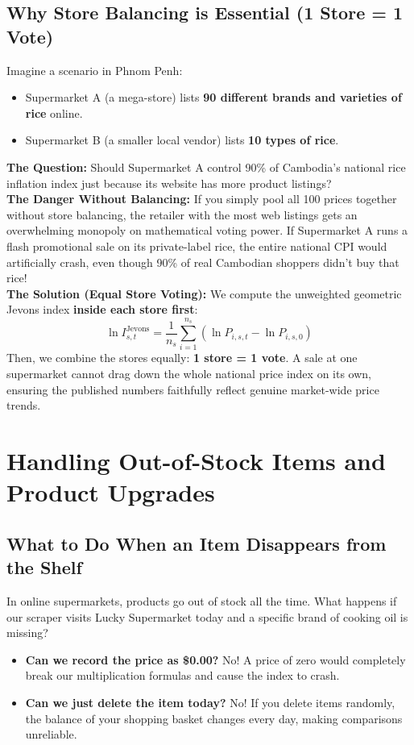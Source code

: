 \documentclass[11pt,a4paper,oneside]{article}
\begin{document}
\subsection{Why Store Balancing is Essential (1 Store = 1 Vote)}
Imagine a scenario in Phnom Penh:
\begin{itemize}
    \item Supermarket A (a mega-store) lists \textbf{90 different brands and varieties of rice} online.
    \item Supermarket B (a smaller local vendor) lists \textbf{10 types of rice}.
\end{itemize}
\textbf{The Question:} Should Supermarket A control 90\% of Cambodia's national rice inflation index just because its website has more product listings?\\
\textbf{The Danger Without Balancing:} If you simply pool all 100 prices together without store balancing, the retailer with the most web listings gets an overwhelming monopoly on mathematical voting power. If Supermarket A runs a flash promotional sale on its private-label rice, the entire national CPI would artificially crash, even though 90\% of real Cambodian shoppers didn't buy that rice!\\
\textbf{The Solution (Equal Store Voting):} We compute the unweighted geometric Jevons index \textbf{inside each store first}:
\begin{equation}
\ln I_{s, t}^{\text{Jevons}} = \frac{1}{n_s} \sum_{i=1}^{n_s} \left( \ln P_{i, s, t} - \ln P_{i, s, 0} \right)
\end{equation}
Then, we combine the stores equally: \textbf{1 store = 1 vote}. A sale at one supermarket cannot drag down the whole national price index on its own, ensuring the published numbers faithfully reflect genuine market-wide price trends.

\newpage

\section{Handling Out-of-Stock Items and Product Upgrades}

\subsection{What to Do When an Item Disappears from the Shelf}
In online supermarkets, products go out of stock all the time. What happens if our scraper visits Lucky Supermarket today and a specific brand of cooking oil is missing?
\begin{itemize}
    \item \textbf{Can we record the price as \$0.00?} No! A price of zero would completely break our multiplication formulas and cause the index to crash.
    \item \textbf{Can we just delete the item today?} No! If you delete items randomly, the balance of your shopping basket changes every day, making comparisons unreliable.
\end{itemize}
\end{document}
